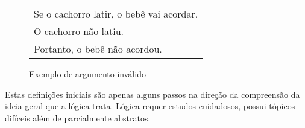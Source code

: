 \begin{figure}[!tbh]
\label{fig:exemplo_arg_invalido}
\begin{center}
        \begin{tabular}{|l|}
            \hline
            Se o cachorro latir, o bebê vai acordar. \\
            O cachorro não latiu.\\
            Portanto, o bebê não acordou.\\
            \hline
        \end{tabular}
\end{center}
    \caption{Exemplo de argumento inválido}
\end{figure}

Estas definições iniciais são apenas alguns passos na direção da compreensão da
ideia geral que a lógica trata. Lógica requer estudos cuidadosos, possui 
tópicos difíceis além de parcialmente abstratos.
